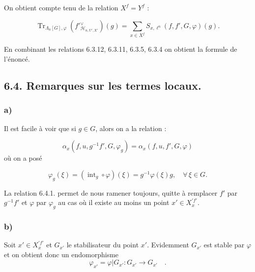 \documentclass[11pt]{article}
\providecommand{\Tr}{\operatorname{Tr}}
\providecommand{\Tr}{\operatorname{Tr}}
\providecommand{\Tr}{\operatorname{Tr}}
\providecommand{\Tr}{\operatorname{Tr}}
\providecommand{\La}{\Lambda}
\providecommand{\Tr}{\operatorname{Tr}}
\begin{document}
On
obtient compte tenu de la relation $X^f=Y^f$ :

\begin{equation}\tag{6.3.12}
\Tr_{\La_n[G],\varphi}(f'{}^\vee_{\mathcal{H}_{n,U',X'}})(g)=\sum_{x\in X^f}S_{x,\ell^n}(f,f',G,\varphi)(g).
\end{equation}

En combinant les relations 6.3.12, 6.3.11, 6.3.5, 6.3.4 on obtient la formule de l'énoncé.

\subsection*{6.4. Remarques sur les termes locaux.}
\subsubsection*{a)} Il est facile à voir que si $g\in G$, alors on a la relation :

\begin{equation}\tag{6.4.1}
\alpha_x(f,u,g^{-1}f',G,\varphi_g)=\alpha_x(f,u,f',G,\varphi)
\end{equation}
où on a posé

\begin{equation}\tag{6.4.2}
\varphi_g(\xi)=(\operatorname{int}_g\circ\varphi)(\xi)=g^{-1}\varphi(\xi)g,
\quad \forall\,\xi\in G.
\end{equation}

La relation 6.4.1. permet de nous ramener toujours, quitte à remplacer $f'$ par $g^{-1}f'$ et $\varphi$ par $\varphi_g$ au cas où il existe au moins un point $x'\in X_x^{\prime f'}$.

\subsubsection*{b)} Soit $x'\in X_x^{\prime f'}$ et $G_{x'}$ le stabilisateur du point $x'$. Evidemment $G_{x'}$ est stable par $\varphi$ et on obtient donc un endomorphisme%
\[
\varphi_{x'} = \varphi|G_{x'} : G_{x'} \longrightarrow G_{x'} \quad .
\]
\end{document}
